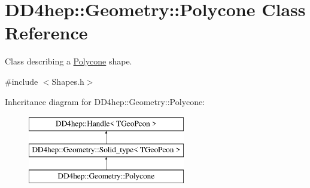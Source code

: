 \hypertarget{class_d_d4hep_1_1_geometry_1_1_polycone}{}\section{D\+D4hep\+:\+:Geometry\+:\+:Polycone Class Reference}
\label{class_d_d4hep_1_1_geometry_1_1_polycone}


Class describing a \hyperlink{class_d_d4hep_1_1_geometry_1_1_polycone}{Polycone} shape.  




{\ttfamily \#include $<$Shapes.\+h$>$}

Inheritance diagram for D\+D4hep\+:\+:Geometry\+:\+:Polycone\+:\begin{figure}[H]
\begin{center}
\leavevmode
\includegraphics[height=3.000000cm]{class_d_d4hep_1_1_geometry_1_1_polycone}
\end{center}
\end{figure}
